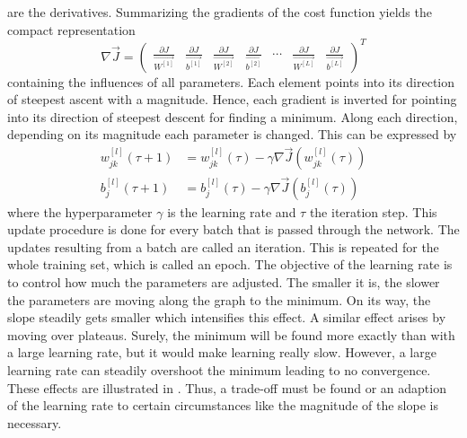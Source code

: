 are the derivatives.
Summarizing the gradients of the cost function yields the compact representation
\begin{equation}
	\label{eq:cost-gradient}
	\nabla \vec{J} =
	\begin{pmatrix}
		\frac{\partial J}{\vec{W^{[1]}}} &
		\frac{\partial J}{\vec{b^{[1]}}} &
		\frac{\partial J}{\vec{W^{[2]}}} &
		\frac{\partial J}{\vec{b^{[2]}}} &
		\cdots &
		\frac{\partial J}{\vec{W^{[L]}}} &
		\frac{\partial J}{\vec{b^{[L]}}}
	\end{pmatrix}^T
\end{equation}
containing the influences of all parameters.
Each element points into its direction of steepest ascent with a magnitude.
Hence, each gradient is inverted for pointing into its direction of steepest descent for finding a minimum.
Along each direction, depending on its magnitude each parameter is changed.
This can be expressed by
\begin{subequations}
	\label{eq:learning-rate}
	\begin{align}
		w^{[l]}_{jk}(\tau + 1) &= w^{[l]}_{jk}(\tau) - \gamma \nabla \vec{J}(w^{[l]}_{jk}(\tau)) \\
		b^{[l]}_j(\tau + 1) &= b^{[l]}_j(\tau) - \gamma \nabla \vec{J}(b^{[l]}_j(\tau))
	\end{align}
\end{subequations}
where the hyperparameter $\gamma$ is the learning rate and $\tau$ the iteration step.
This update procedure is done for every batch that is passed through the network.
The updates resulting from a batch are called an iteration.
This is repeated for the whole training set, which is called an epoch.
The objective of the learning rate is to control how much the parameters are adjusted.
The smaller it is, the slower the parameters are moving along the graph to the minimum.
On its way, the slope steadily gets smaller which intensifies this effect.
A similar effect arises by moving over plateaus.
Surely, the minimum will be found more exactly than with a large learning rate, but it would make learning really slow.
However, a large learning rate can steadily overshoot the minimum leading to no convergence.
These effects are illustrated in .
Thus, a trade-off must be found or an adaption of the learning rate to certain circumstances like the magnitude of the slope is necessary.
